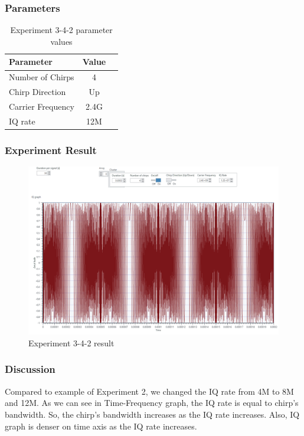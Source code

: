 \clearpage
    
    \subsubsection*{Parameters}
    \begin{table}[!h]\centering
        \hspace{10mm}
        \begin{tabular}{|l|c|c|}
        \hline
        \multicolumn{1}{|l|}{Parameter} & \multicolumn{1}{l|}{Value} \\
        \hline
        Number of Chirps & 4 \\ 
        \hline
        Chirp Direction & Up \\ 
        \hline
        Carrier Frequency & 2.4G \\ 
        \hline
        IQ rate & 12M \\ 
        \hline
        \end{tabular}
        \caption{Experiment 3-4-2 parameter values}
    \end{table}
    
    \subsubsection*{Experiment Result}
    \vspace{-4mm}  
    \begin{figure}[!h]\raggedleft
    \hspace{15mm}
		\includegraphics[width=.95\textwidth]{image/week03/3-4-2.png}
		\caption{\footnotesize Experiment 3-4-2 result}
		\vspace{-10pt}
    \end{figure}
    
    \subsubsection*{Discussion}
    Compared to example of Experiment 2, we changed the IQ rate from 4M to 8M and 12M. As we can see in Time-Frequency graph, the IQ rate is equal to chirp’s bandwidth. So, the chirp’s bandwidth increases as the IQ rate increases. Also, IQ graph is denser on time axis as the IQ rate increases. \\
\clearpage